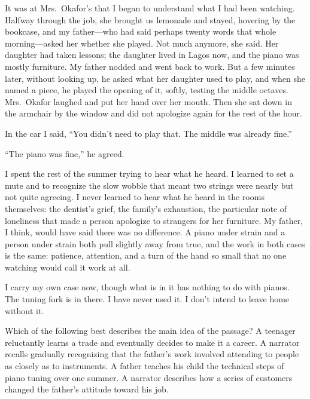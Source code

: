 \documentclass[11pt]{article}
\begin{document}
\begin{passage}
It was at Mrs.~Okafor's that I began to understand what I had been watching. Halfway through the job, she brought us lemonade and stayed, hovering by the bookcase, and my father---who had said perhaps twenty words that whole morning---asked her whether she played. Not much anymore, she said. Her daughter had taken lessons; the daughter lived in Lagos now, and the piano was mostly furniture. My father nodded and went back to work. But a few minutes later, without looking up, he asked what her daughter used to play, and when she named a piece, he played the opening of it, softly, testing the middle octaves. Mrs.~Okafor laughed and put her hand over her mouth. Then she sat down in the armchair by the window and did not apologize again for the rest of the hour.

In the car I said, ``You didn't need to play that. The middle was already fine.''

``The piano was fine,'' he agreed.

I spent the rest of the summer trying to hear what he heard. I learned to set a mute and to recognize the slow wobble that meant two strings were nearly but not quite agreeing. I never learned to hear what he heard in the rooms themselves: the dentist's grief, the family's exhaustion, the particular note of loneliness that made a person apologize to strangers for her furniture. My father, I think, would have said there was no difference. A piano under strain and a person under strain both pull slightly away from true, and the work in both cases is the same: patience, attention, and a turn of the hand so small that no one watching would call it work at all.

I carry my own case now, though what is in it has nothing to do with pianos. The tuning fork is in there. I have never used it. I don't intend to leave home without it.
\end{passage}

{Which of the following best describes the main idea of the passage?}
{A teenager reluctantly learns a trade and eventually decides to make it a career.}
{A narrator recalls gradually recognizing that the father's work involved attending to people as closely as to instruments.}
{A father teaches his child the technical steps of piano tuning over one summer.}
{A narrator describes how a series of customers changed the father's attitude toward his job.}
\end{document}
